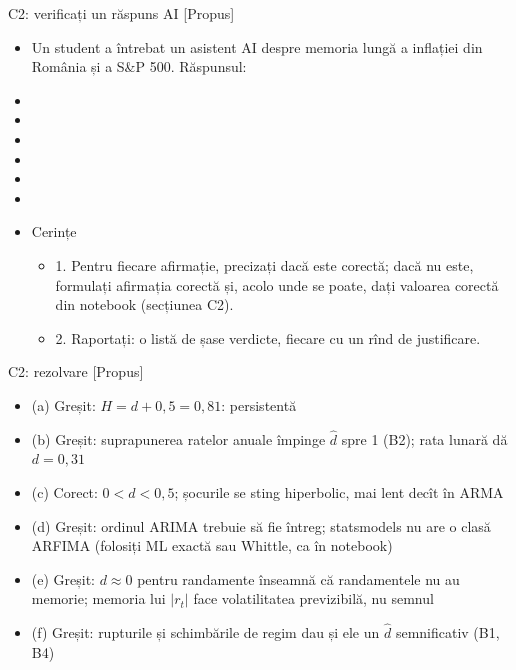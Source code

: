 \begin{frame}{C2: verificați un răspuns AI [Propus]}
\itemsize{\scriptsize}
\begin{itemize}
    \item Un student a întrebat un asistent AI despre memoria lungă a inflației din România și a S\&P 500. Răspunsul:
    \item {}
    \item {}
    \item {}
    \item {}
    \item {}
    \item {}
    \item Cerințe
    \begin{itemize}
        \item 1. Pentru fiecare afirmație, precizați dacă este corectă; dacă nu este, formulați afirmația corectă și, acolo unde se poate, dați valoarea corectă din notebook (secțiunea C2).
        \item 2. Raportați: o listă de șase verdicte, fiecare cu un rînd de justificare.
    \end{itemize}
\end{itemize}
\end{frame}

\ifsolutions
\begin{frame}{C2: rezolvare [Propus]}
\itemsize{\scriptsize}
\begin{itemize}
    \item (a) Greșit: $H = d + 0{,}5 = 0{,}81$: persistentă
    \item (b) Greșit: suprapunerea ratelor anuale împinge $\hat d$ spre 1 (B2); rata lunară dă $d = 0{,}31$
    \item (c) Corect: $0 < d < 0{,}5$; șocurile se sting hiperbolic, mai lent decît în ARMA
    \item (d) Greșit: ordinul ARIMA trebuie să fie întreg; statsmodels nu are o clasă ARFIMA (folosiți ML exactă sau Whittle, ca în notebook)
    \item (e) Greșit: $d \approx 0$ pentru randamente înseamnă că randamentele nu au memorie; memoria lui $|r_t|$ face volatilitatea previzibilă, nu semnul
    \item (f) Greșit: rupturile și schimbările de regim dau și ele un $\hat d$ semnificativ (B1, B4)
\end{itemize}
\end{frame}
\fi



